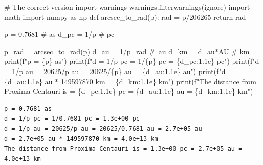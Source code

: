 \documentclass[
  letterpaper,
  DIV=11,
  numbers=noendperiod]{scrreprt}
\newenvironment{Shaded}{\begin{snugshade}}{\end{snugshade}}
\newcommand{\BuiltInTok}[1]{\textcolor[rgb]{0.00,0.23,0.31}{#1}}
\newcommand{\CommentTok}[1]{\textcolor[rgb]{0.37,0.37,0.37}{#1}}
\newcommand{\ControlFlowTok}[1]{\textcolor[rgb]{0.00,0.23,0.31}{#1}}
\newcommand{\DecValTok}[1]{\textcolor[rgb]{0.68,0.00,0.00}{#1}}
\newcommand{\FloatTok}[1]{\textcolor[rgb]{0.68,0.00,0.00}{#1}}
\newcommand{\ImportTok}[1]{\textcolor[rgb]{0.00,0.46,0.62}{#1}}
\newcommand{\KeywordTok}[1]{\textcolor[rgb]{0.00,0.23,0.31}{#1}}
\newcommand{\NormalTok}[1]{\textcolor[rgb]{0.00,0.23,0.31}{#1}}
\newcommand{\OperatorTok}[1]{\textcolor[rgb]{0.37,0.37,0.37}{#1}}
\newcommand{\SpecialCharTok}[1]{\textcolor[rgb]{0.37,0.37,0.37}{#1}}
\newcommand{\SpecialStringTok}[1]{\textcolor[rgb]{0.13,0.47,0.30}{#1}}
\newcommand{\StringTok}[1]{\textcolor[rgb]{0.13,0.47,0.30}{#1}}
\begin{document}
\begin{Shaded}
\begin{Highlighting}[]
\CommentTok{\# The correct version}
\ImportTok{import}\NormalTok{ warnings}
\NormalTok{warnings.filterwarnings(}\StringTok{\textquotesingle{}ignore\textquotesingle{}}\NormalTok{)}
\ImportTok{import}\NormalTok{ math}
\ImportTok{import}\NormalTok{ numpy }\ImportTok{as}\NormalTok{ np}
\KeywordTok{def}\NormalTok{ arcsec\_to\_rad(p):}
\NormalTok{    rad }\OperatorTok{=}\NormalTok{ p}\OperatorTok{/}\DecValTok{206265}
    \ControlFlowTok{return}\NormalTok{ rad}

\NormalTok{p }\OperatorTok{=} \FloatTok{0.7681} \CommentTok{\# as}
\NormalTok{d\_pc }\OperatorTok{=} \DecValTok{1}\OperatorTok{/}\NormalTok{p }\CommentTok{\# pc}

\NormalTok{p\_rad }\OperatorTok{=}\NormalTok{ arcsec\_to\_rad(p)}
\NormalTok{d\_au }\OperatorTok{=} \DecValTok{1}\OperatorTok{/}\NormalTok{p\_rad }\CommentTok{\# au}
\NormalTok{d\_km }\OperatorTok{=}\NormalTok{ d\_au}\OperatorTok{*}\NormalTok{AU }\CommentTok{\# km}
\BuiltInTok{print}\NormalTok{(}\SpecialStringTok{f"p = }\SpecialCharTok{\{}\NormalTok{p}\SpecialCharTok{\}}\SpecialStringTok{ as"}\NormalTok{)}
\BuiltInTok{print}\NormalTok{(}\SpecialStringTok{f"d = 1/p pc = 1/}\SpecialCharTok{\{}\NormalTok{p}\SpecialCharTok{\}}\SpecialStringTok{ pc = }\SpecialCharTok{\{}\NormalTok{d\_pc}\SpecialCharTok{:1.1e\}}\SpecialStringTok{ pc"}\NormalTok{)}
\BuiltInTok{print}\NormalTok{(}\SpecialStringTok{f"d = 1/p au = 20625/p au = 20625/}\SpecialCharTok{\{}\NormalTok{p}\SpecialCharTok{\}}\SpecialStringTok{ au = }\SpecialCharTok{\{}\NormalTok{d\_au}\SpecialCharTok{:1.1e\}}\SpecialStringTok{ au"}\NormalTok{)}
\BuiltInTok{print}\NormalTok{(}\SpecialStringTok{f"d = }\SpecialCharTok{\{}\NormalTok{d\_au}\SpecialCharTok{:1.1e\}}\SpecialStringTok{ au * 149597870 km = }\SpecialCharTok{\{}\NormalTok{d\_km}\SpecialCharTok{:1.1e\}}\SpecialStringTok{ km"}\NormalTok{)}
\BuiltInTok{print}\NormalTok{(}\SpecialStringTok{f"The distance from Proxima Centauri is = }\SpecialCharTok{\{}\NormalTok{d\_pc}\SpecialCharTok{:1.1e\}}\SpecialStringTok{ pc = }\SpecialCharTok{\{}\NormalTok{d\_au}\SpecialCharTok{:1.1e\}}\SpecialStringTok{ au = }\SpecialCharTok{\{}\NormalTok{d\_km}\SpecialCharTok{:1.1e\}}\SpecialStringTok{ km"}\NormalTok{)}
\end{Highlighting}
\end{Shaded}

\begin{verbatim}
p = 0.7681 as
d = 1/p pc = 1/0.7681 pc = 1.3e+00 pc
d = 1/p au = 20625/p au = 20625/0.7681 au = 2.7e+05 au
d = 2.7e+05 au * 149597870 km = 4.0e+13 km
The distance from Proxima Centauri is = 1.3e+00 pc = 2.7e+05 au = 4.0e+13 km
\end{verbatim}
\end{document}
